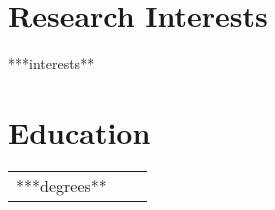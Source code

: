 \documentclass[10pt]{article}
\begin{document}
\section{Research Interests}

***interests**


\newcommand{\degree}[6]{\textsc{#1} & #2 in \textsc{#3} & \textbf{#4}\\
                        & \ifthenelse{\equal{#5}{}}{\small ~}{\small Advisors: #5} & \\
                        & \ifthenelse{\equal{#6}{}}{~}{\footnotesize Dissertation: ``#6''} & \\[1ex]
                        }

\section{Education}
\begin{tabularx}{\linewidth}{@{}r X l}


  ***degrees**

\end{tabularx}

\vspace{-2em}

\newcommand{\experience}[4]{
\textsc{#1} & #2 \\
\nopagebreak &\emph{#3}\\
\nopagebreak &\footnotesize{#4} \\
\nopagebreak \multicolumn{2}{c}{} \\ [-1ex]
}



\end{document}

